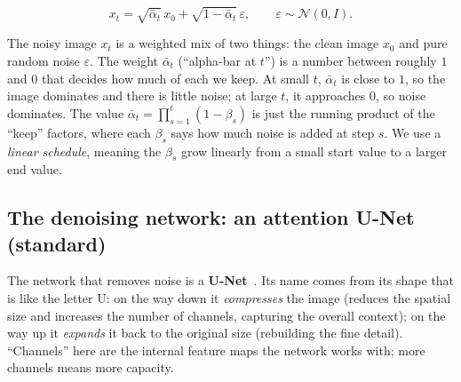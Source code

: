 \documentclass[11pt]{article}
\begin{document}
\begin{equation}
  x_t = \sqrt{\bar{\alpha}_t}\,x_0 + \sqrt{1-\bar{\alpha}_t}\,\varepsilon,
  \qquad \varepsilon \sim \mathcal{N}(0, I).
  \label{eq:forward}
\end{equation}

\noindent The noisy image $x_t$ is a weighted mix of two things: the
clean image $x_0$ and pure random noise $\varepsilon$. The weight $\bar{\alpha}_t$ (``alpha-bar at $t$'') is a number between roughly $1$ and $0$ that decides how much of
each we keep. At small $t$, $\bar{\alpha}_t$ is close to $1$, so the image dominates and
there is little noise; at large $t$, it approaches $0$, so noise dominates. The value
$\bar{\alpha}_t = \prod_{s=1}^{t}(1-\beta_s)$ is just the running product of the
``keep'' factors, where each $\beta_s$ says how much noise is added at step $s$. We use a
\emph{linear schedule}, meaning the $\beta_s$ grow linearly from a small start value to a
larger end value.

\subsection{The denoising network: an attention U-Net (standard)}
The network that removes noise is a \textbf{U-Net}~\cite{ho2020ddpm}. Its name comes from its shape that is like
the letter U: on the way down it \emph{compresses} the image (reduces the spatial size
and increases the number of channels, capturing the overall context); on the way up it
\emph{expands} it back to the original size (rebuilding the fine detail). ``Channels''
here are the internal feature maps the network works with; more channels means more
capacity.
\end{document}
